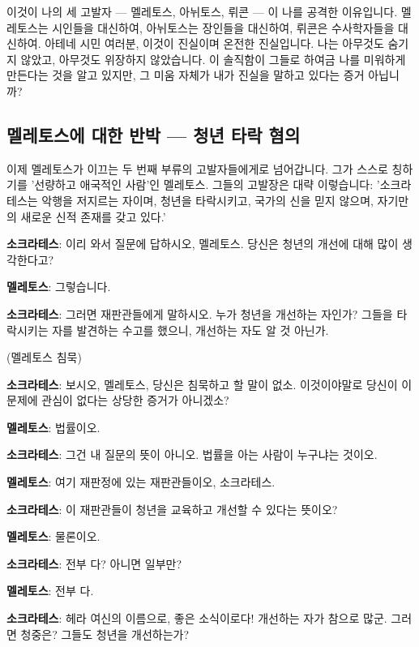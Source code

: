 \documentclass[11pt, a4paper]{article}
\begin{document}
이것이 나의 세 고발자 — 멜레토스, 아뉘토스, 뤼콘 — 이 나를 공격한 이유입니다. 멜레토스는 시인들을 대신하여, 아뉘토스는 장인들을 대신하여, 뤼콘은 수사학자들을 대신하여. 아테네 시민 여러분, 이것이 진실이며 온전한 진실입니다. 나는 아무것도 숨기지 않았고, 아무것도 위장하지 않았습니다. 이 솔직함이 그들로 하여금 나를 미워하게 만든다는 것을 알고 있지만, 그 미움 자체가 내가 진실을 말하고 있다는 증거 아닙니까?


\bigskip


\subsection{멜레토스에 대한 반박 — 청년 타락 혐의}


이제 멜레토스가 이끄는 두 번째 부류의 고발자들에게로 넘어갑니다. 그가 스스로 칭하기를 '선량하고 애국적인 사람'인 멜레토스. 그들의 고발장은 대략 이렇습니다: '소크라테스는 악행을 저지르는 자이며, 청년을 타락시키고, 국가의 신을 믿지 않으며, 자기만의 새로운 신적 존재를 갖고 있다.'


\noindent\textbf{소크라테스}: 이리 와서 질문에 답하시오, 멜레토스. 당신은 청년의 개선에 대해 많이 생각한다고?


\noindent\textbf{멜레토스}: 그렇습니다.


\noindent\textbf{소크라테스}: 그러면 재판관들에게 말하시오. 누가 청년을 개선하는 자인가? 그들을 타락시키는 자를 발견하는 수고를 했으니, 개선하는 자도 알 것 아닌가.


(멜레토스 침묵)


\noindent\textbf{소크라테스}: 보시오, 멜레토스, 당신은 침묵하고 할 말이 없소. 이것이야말로 당신이 이 문제에 관심이 없다는 상당한 증거가 아니겠소?


\noindent\textbf{멜레토스}: 법률이오.


\noindent\textbf{소크라테스}: 그건 내 질문의 뜻이 아니오. 법률을 아는 사람이 누구냐는 것이오.


\noindent\textbf{멜레토스}: 여기 재판정에 있는 재판관들이오, 소크라테스.


\noindent\textbf{소크라테스}: 이 재판관들이 청년을 교육하고 개선할 수 있다는 뜻이오?


\noindent\textbf{멜레토스}: 물론이오.


\noindent\textbf{소크라테스}: 전부 다? 아니면 일부만?


\noindent\textbf{멜레토스}: 전부 다.


\noindent\textbf{소크라테스}: 헤라 여신의 이름으로, 좋은 소식이로다! 개선하는 자가 참으로 많군. 그러면 청중은? 그들도 청년을 개선하는가?
\end{document}
